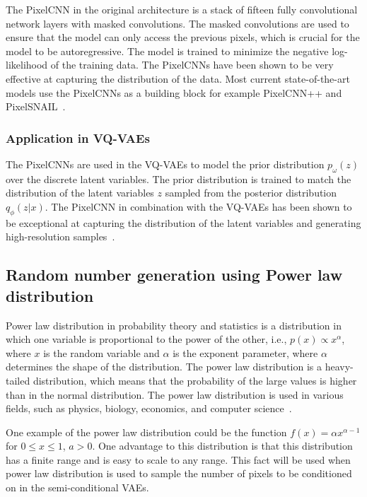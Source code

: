 The PixelCNN in the original architecture is a stack of fifteen fully convolutional network layers with masked convolutions. The masked convolutions are used to ensure that the model can only access the previous pixels, which is crucial for the model to be autoregressive. The model is trained to minimize the negative log-likelihood of the training data. The PixelCNNs have been shown to be very effective at capturing the distribution of the data. Most current state-of-the-art models use the PixelCNNs as a building block for example PixelCNN++ and PixelSNAIL~\cite{pixelcnn, pixelcnnpp,pixelsnail}.

\subsubsection{Application in VQ-VAEs}

The PixelCNNs are used in the VQ-VAEs to model the prior distribution $p_{\omega}(z)$ over the discrete latent variables. The prior distribution is trained to match the distribution of the latent variables $z$ sampled from the posterior distribution $q_{\phi}(z|x)$. The PixelCNN in combination with the VQ-VAEs has been shown to be exceptional at capturing the distribution of the latent variables and generating high-resolution samples~\cite{vqvae}.


\subsection{Random number generation using Power law distribution}

Power law distribution in probability theory and statistics is a distribution in which one variable is proportional to the power of the other, i.e., 
$p(x) \propto x^{\alpha}$, where $x$ is the random variable and $\alpha$ is the exponent parameter, where $\alpha$ determines the shape of the distribution. The power law distribution is a heavy-tailed distribution, which means that the probability of the large values is higher than in the normal distribution. The power law distribution is used in various fields, such as physics, biology, economics, and computer science~\cite{powerlaw}. 

One example of the power law distribution could be the function $ f(x) = \alpha x^{\alpha - 1} $ for $ 0 \leq x \leq 1 $, $a > 0$. One advantage to this distribution is that this distribution has a finite range and is easy to scale to any range. This fact will be used when power law distribution is used to sample the number of pixels to be conditioned on in the semi-conditional VAEs.

